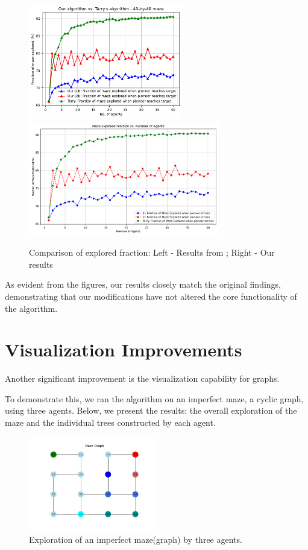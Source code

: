 \begin{figure}[H]
    \centering
    \includegraphics[height=5cm]{Cap3/arthur_tarry_40x40_fraction.pdf}
    \includegraphics[height=5cm]{Cap3/self_fraction_40_by_40_tarry.pdf}
    \caption{Comparison of explored fraction: Left - Results from ; Right - Our results}
\label{fig_comparison_fraction}
\end{figure}

As evident from the figures, our results closely match the original findings,
demonstrating that our modifications have not altered the core functionality of the algorithm.

\section{Visualization Improvements}
\label{section_result_visualization}

Another significant improvement is the visualization capability for graphs.

To demonstrate this, we ran the algorithm on an imperfect maze, a cyclic graph, using three agents.
Below, we present the results: the overall exploration of the maze and the individual trees constructed by each agent.

\begin{figure}[H]
\centering
\includegraphics[width=0.5\textwidth]{Cap3/maze_imperfect_exploration.png}
\caption{Exploration of an imperfect maze(graph) by three agents.}
\label{fig_imperfect_maze_exploration}
\end{figure}
    

